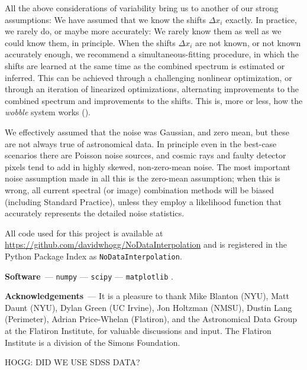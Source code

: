 \documentclass[modern]{aastex631}
\renewcommand{\paragraph}[1]{\medskip\par\noindent\textbf{#1}~---}
\begin{document}
All the above considerations of variability bring us to another of our strong assumptions:
We have assumed that we know the shifts $\Delta x_i$ exactly.
In practice, we rarely do, or maybe more accurately: We rarely know them as well as we could know them, in principle.
When the shifts $\Delta x_i$ are not known, or not known accurately enough, we recommend a simultaneous-fitting procedure, in which the shifts are learned at the same time as the combined spectrum is estimated or inferred.
This can be achieved through a challenging nonlinear optimization, or through an iteration of linearized optimizations, alternating improvements to the combined spectrum and improvements to the shifts.
This is, more or less, how the \textsl{wobble} system works (\citealt{wobble}).

We effectively assumed that the noise was Gaussian, and zero mean, but these are not always true of astronomical data.
In principle even in the best-case scenarios there are Poisson noise sources, and cosmic rays and faulty detector pixels tend to add in highly skewed, non-zero-mean noise.
The most important noise assumption made in all this is the zero-mean assumption; when this is wrong, all current spectral (or image) combination methods will be biased (including Standard Practice), unless they employ a likelihood function that accurately represents the detailed noise statistics.

All code used for this project is available at \url{https://github.com/davidwhogg/NoDataInterpolation} and is registered in the Python Package Index as \texttt{NoDataInterpolation}.

\paragraph{Software}
\texttt{numpy} \citep{numpy} ---
\texttt{scipy} \citep{scipy} ---
\texttt{matplotlib} \citep{matplotlib}.

\paragraph{Acknowledgements}
It is a pleasure to thank
Mike Blanton (NYU),
Matt Daunt (NYU),
Dylan Green (UC Irvine),
Jon Holtzman (NMSU), 
Dustin Lang (Perimeter),
Adrian Price-Whelan (Flatiron),
and the Astronomical Data Group at the Flatiron Institute,
for valuable discussions and input.
The Flatiron Institute is a division of the Simons Foundation.

HOGG: DID WE USE SDSS DATA?
\end{document}
